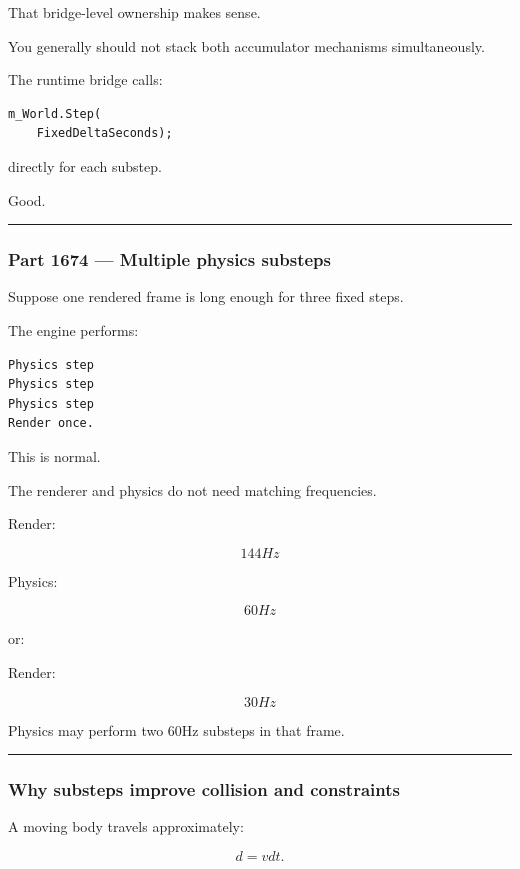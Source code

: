 That bridge-level ownership makes sense.

You generally should not stack both accumulator mechanisms simultaneously.

The runtime bridge calls:

\begin{verbatim}
m_World.Step(
    FixedDeltaSeconds);
\end{verbatim}

directly for each substep.

Good.

\begin{center}\rule{0.5\linewidth}{0.5pt}\end{center}

\subsubsection{Part 1674 --- Multiple physics substeps}\label{part-1674-multiple-physics-substeps}

Suppose one rendered frame is long enough for three fixed steps.

The engine performs:

\begin{verbatim}
Physics step
Physics step
Physics step
Render once.
\end{verbatim}

This is normal.

The renderer and physics do not need matching frequencies.

Render:

\[
144Hz
\]

Physics:

\[
60Hz
\]

or:

Render:

\[
30Hz
\]

Physics may perform two 60Hz substeps in that frame.

\begin{center}\rule{0.5\linewidth}{0.5pt}\end{center}

\subsubsection{Why substeps improve collision and constraints}\label{why-substeps-improve-collision-and-constraints}

A moving body travels approximately:

\[
d=vdt.
\]

